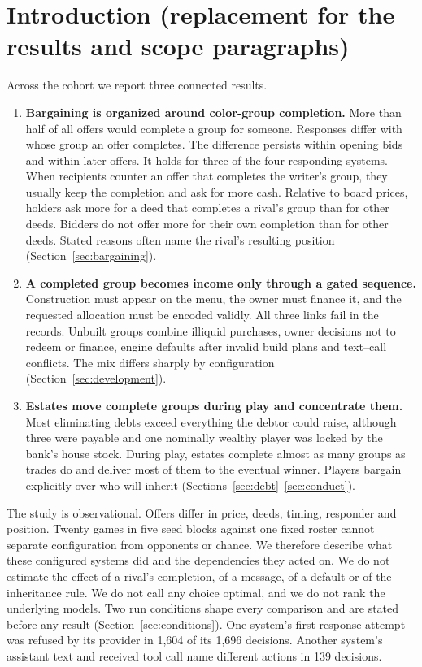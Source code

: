 \section{Introduction (replacement for the results and scope paragraphs)}

Across the cohort we report three connected results.

\begin{enumerate}
\item \textbf{Bargaining is organized around color-group completion.} More than half of all offers would complete a group for someone. Responses differ with whose group an offer completes. The difference persists within opening bids and within later offers. It holds for three of the four responding systems. When recipients counter an offer that completes the writer's group, they usually keep the completion and ask for more cash. Relative to board prices, holders ask more for a deed that completes a rival's group than for other deeds. Bidders do not offer more for their own completion than for other deeds. Stated reasons often name the rival's resulting position (Section~\ref{sec:bargaining}).
\item \textbf{A completed group becomes income only through a gated sequence.} Construction must appear on the menu, the owner must finance it, and the requested allocation must be encoded validly. All three links fail in the records. Unbuilt groups combine illiquid purchases, owner decisions not to redeem or finance, engine defaults after invalid build plans and text--call conflicts. The mix differs sharply by configuration (Section~\ref{sec:development}).
\item \textbf{Estates move complete groups during play and concentrate them.} Most eliminating debts exceed everything the debtor could raise, although three were payable and one nominally wealthy player was locked by the bank's house stock. During play, estates complete almost as many groups as trades do and deliver most of them to the eventual winner. Players bargain explicitly over who will inherit (Sections~\ref{sec:debt}--\ref{sec:conduct}).
\end{enumerate}

The study is observational. Offers differ in price, deeds, timing, responder and position. Twenty games in five seed blocks against one fixed roster cannot separate configuration from opponents or chance. We therefore describe what these configured systems did and the dependencies they acted on. We do not estimate the effect of a rival's completion, of a message, of a default or of the inheritance rule. We do not call any choice optimal, and we do not rank the underlying models. Two run conditions shape every comparison and are stated before any result (Section~\ref{sec:conditions}). One system's first response attempt was refused by its provider in 1,604 of its 1,696 decisions. Another system's assistant text and received tool call name different actions in 139 decisions.

